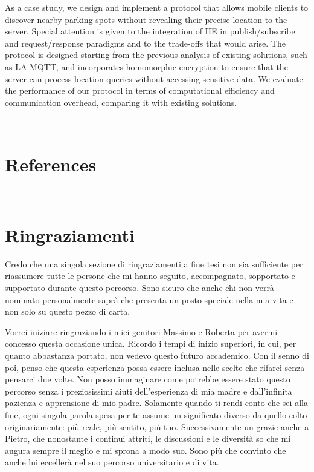 \documentclass[12pt,a4paper,twoside]{book}
\begin{document}
As a case study, we design and implement a protocol that allows mobile clients to discover nearby parking spots without revealing their precise location to the server. 
Special attention is given to the integration of HE in publish/subscribe and request/response paradigms and to the trade-offs that would arise.
The protocol is designed starting from the previous analysis of existing solutions, such as LA-MQTT, and incorporates homomorphic encryption to ensure that the server can process location queries without accessing sensitive data. We evaluate the performance of our protocol in terms of computational efficiency and communication overhead, comparing it with existing solutions.

\topmargin=-1cm
\tableofcontents
\thispagestyle{empty}
\listoftables
\thispagestyle{empty}
\listoffigures
\thispagestyle{empty}
\newpage~\newpage

\raggedbottom

\pagestyle{plain}
\setcounter{page}{1}










\renewcommand{\bibsection}{}
\chapter*{References}

\newpage

\renewcommand{\appendixtocname}{Appendices}
{}

\newpage~\newpage
\chapter*{Ringraziamenti}
Credo che una singola sezione di ringraziamenti a fine tesi non sia sufficiente per riassumere tutte le persone che mi hanno seguito, accompagnato, sopportato e supportato durante questo percorso. Sono sicuro che anche chi non verrà nominato personalmente saprà che presenta un posto speciale nella mia vita e non solo su questo pezzo di carta.

Vorrei iniziare ringraziando i miei genitori Massimo e Roberta per avermi concesso questa occasione unica. Ricordo i tempi di inizio superiori, in cui, per quanto abbastanza portato, non vedevo questo futuro accademico. Con il senno di poi, penso che questa esperienza possa essere inclusa nelle scelte che rifarei senza pensarci due volte. Non posso immaginare come potrebbe essere stato questo percorso senza i preziosissimi aiuti dell'esperienza di mia madre e dall'infinita pazienza e apprensione di mio padre. Solamente quando ti rendi conto che sei alla fine, ogni singola parola spesa per te assume un significato diverso da quello colto originariamente: più reale, più sentito, più tuo.
Successivamente un grazie anche a Pietro, che nonostante i continui attriti, le discussioni e le diversità so che mi augura sempre il meglio e mi sprona a modo suo. Sono più che convinto che anche lui eccellerà nel suo percorso universitario e di vita.
\end{document}
